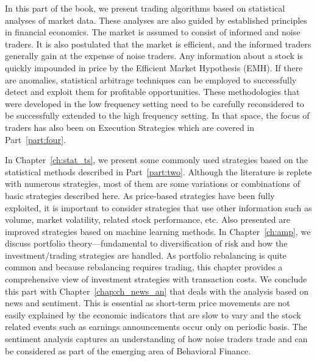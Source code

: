 
In this part of the book, we present trading algorithms based on statistical analyses of market data. These analyses are also guided by established principles in financial economics. The market is assumed to consist of informed and noise traders. It is also postulated that the market is efficient, and the informed traders generally gain at the expense of noise traders. Any information about a stock is quickly impounded in price by the Efficient Market Hypothesis (EMH). If there are anomalies, statistical arbitrage techniques can be employed to successfully detect and exploit them for profitable opportunities. These methodologies that were developed in the low frequency setting need to be carefully reconsidered to be successfully extended to the high frequency setting. In that space, the focus of traders has also been on Execution Strategies which are covered in Part~\ref{part:four}.


In Chapter~\ref{ch:stat_ts}, we present some commonly used strategies based on the statistical methods described in Part~\ref{part:two}. Although the literature is replete with numerous strategies, most of them are some variations or combinations of basic strategies described here. As price-based strategies have been fully exploited, it is important to consider strategies that use other information such as volume, market volatility, related stock performance, etc. Also presented are improved strategies based on machine learning methods. In Chapter~\ref{ch:amp}, we discuss portfolio theory---fundamental to diversification of risk and how the investment/trading strategies are handled. As portfolio rebalancing is quite common and because rebalancing requires trading, this chapter provides a comprehensive view of investment strategies with transaction costs. We conclude this part with Chapter~\ref{chap:ch_news_an} that deals with the analysis based on news and sentiment. This is essential as short-term price movements are not easily explained by the economic indicators that are slow to vary and the stock related events such as earnings announcements occur only on periodic basis. The sentiment analysis captures an understanding of how noise traders trade and can be considered as part of the emerging area of Behavioral Finance. 